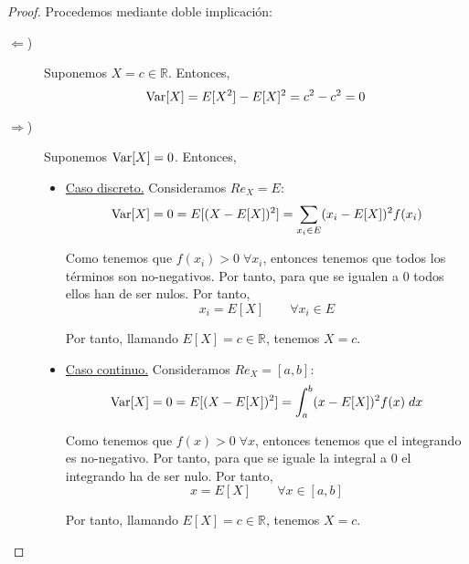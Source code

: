 \begin{proof}
    Procedemos mediante doble implicación:
    \begin{description}
        \item [$\Longleftarrow$)] Suponemos $X=c\in \mathbb{R}$. Entonces,
        \begin{equation*}
            \operatorname{Var}[X] = E[X^2]-E[X]^2 = c^2 -c^2 = 0
        \end{equation*}

        \item [$\Longrightarrow$)] Suponemos $\operatorname{Var}[X]=0$. Entonces,
        \begin{itemize}
            \item \underline{Caso discreto.} Consideramos $Re_X = E$:
            \begin{equation*}
                \operatorname{Var}[X] = 0 = E[(X-E[X])^2]
                = \sum_{x_i\in E}(x_i-E[X])^2 f(x_i)
            \end{equation*}

            Como tenemos que $f(x_i)> 0\;\forall x_i$, entonces tenemos que todos los términos son no-negativos. Por tanto, para que se igualen a $0$ todos ellos han de ser nulos. Por tanto,
            \begin{equation*}
                x_i = E[X] \qquad \forall x_i \in E
            \end{equation*}

            Por tanto, llamando $E[X]=c\in \mathbb{R}$, tenemos $X=c$.



            \item \underline{Caso continuo.} Consideramos $Re_X = [a,b]$:
            \begin{equation*}
                \operatorname{Var}[X] = 0 = E[(X-E[X])^2]
                = \int_a^b (x-E[X])^2 f(x)\;dx
            \end{equation*}

            Como tenemos que $f(x)> 0\;\forall x$, entonces tenemos que el integrando es no-negativo. Por tanto, para que se iguale la integral a $0$ el integrando ha de ser nulo. Por tanto,
            \begin{equation*}
                x = E[X] \qquad \forall x \in [a,b]
            \end{equation*}

            Por tanto, llamando $E[X]=c\in \mathbb{R}$, tenemos $X=c$.
        \end{itemize}
    \end{description}
\end{proof}


